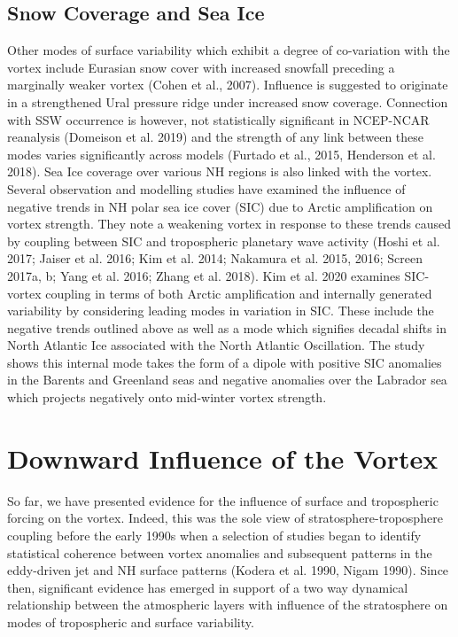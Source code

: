 {\subsection{Snow Coverage and Sea Ice}
\label{sec:external_influence_snow_ice}

Other modes of surface variability which exhibit a degree of co-variation with the vortex include Eurasian snow cover with increased snowfall preceding a marginally weaker vortex (Cohen et al., 2007). Influence is suggested to originate in a strengthened Ural pressure ridge under increased snow coverage. Connection with SSW occurrence is however, not statistically significant in NCEP-NCAR reanalysis (Domeison et al. 2019) and the strength of any link between these modes varies significantly across models (Furtado et al., 2015, Henderson et al. 2018). 
Sea Ice coverage over various NH regions is also linked with the vortex. Several observation and modelling studies have examined the influence of negative trends in NH polar sea ice cover (SIC) due to Arctic amplification on vortex strength. They note a weakening vortex in response to these trends caused by coupling between SIC and tropospheric planetary wave activity (Hoshi et al. 2017; Jaiser et al. 2016; Kim et al. 2014; Nakamura et al. 2015, 2016; Screen 2017a, b; Yang et al. 2016; Zhang et al. 2018). Kim et al. 2020 examines SIC-vortex coupling in terms of both Arctic amplification and internally generated variability by considering leading modes in variation in SIC. These include the negative trends outlined above as well as a mode which signifies decadal shifts in North Atlantic Ice associated with the North Atlantic Oscillation. The study shows this internal mode takes the form of a dipole with positive SIC anomalies in the Barents and Greenland seas and negative anomalies over the Labrador sea which projects negatively onto mid-winter vortex strength. 

\section{Downward Influence of the Vortex}
\label{sec:Downward_influence}
So far, we have presented evidence for the influence of surface and tropospheric forcing on the vortex. Indeed, this was the sole view of stratosphere-troposphere coupling before the early 1990s when a selection of studies began to identify statistical coherence between vortex anomalies and subsequent patterns in the eddy-driven jet and NH surface patterns (Kodera et al. 1990, Nigam 1990). Since then, significant evidence has emerged in support of a two way dynamical relationship between the atmospheric layers with influence of the stratosphere on modes of tropospheric and surface variability.

}
